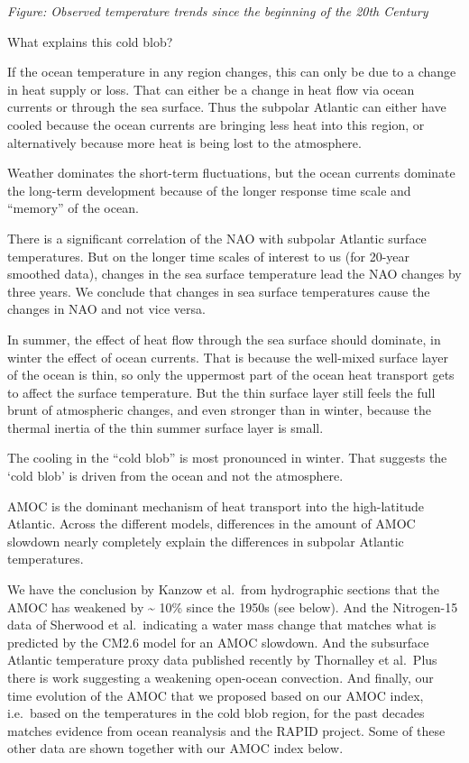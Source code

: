 \documentclass[
]{book}
\begin{document}
\emph{Figure: Observed temperature trends since the beginning of the 20th Century}

What explains this cold blob?

If the ocean temperature in any region changes, this can only be due to a change in heat supply or loss. That can either be a change in heat flow via ocean currents or through the sea surface. Thus the subpolar Atlantic can either have cooled because the ocean currents are bringing less heat into this region, or alternatively because more heat is being lost to the atmosphere.

Weather dominates the short-term fluctuations, but the ocean currents dominate the long-term development because of the longer response time scale and ``memory'' of the ocean.

There is a significant correlation of the NAO with subpolar Atlantic surface temperatures. But on the longer time scales of interest to us (for 20-year smoothed data), changes in the sea surface temperature lead the NAO changes by three years. We conclude that changes in sea surface temperatures cause the changes in NAO and not vice versa.

In summer, the effect of heat flow through the sea surface should dominate, in winter the effect of ocean currents.
That is because the well-mixed surface layer of the ocean is thin, so only the uppermost part of the ocean heat transport gets to affect the surface temperature. But the thin surface layer still feels the full brunt of atmospheric changes, and even stronger than in winter, because the thermal inertia of the thin summer surface layer is small.

The cooling in the ``cold blob'' is most pronounced in winter.
That suggests the `cold blob' is driven from the ocean and not the atmosphere.

AMOC is the dominant mechanism of heat transport into the high-latitude Atlantic.
Across the different models, differences in the amount of AMOC slowdown nearly completely explain the differences in subpolar Atlantic temperatures.

We have the conclusion by Kanzow et al.~from hydrographic sections that the AMOC has weakened by \textasciitilde{} 10\% since the 1950s (see below). And the Nitrogen-15 data of Sherwood et al.~indicating a water mass change that matches what is predicted by the CM2.6 model for an AMOC slowdown. And the subsurface Atlantic temperature proxy data published recently by Thornalley et al.~Plus there is work suggesting a weakening open-ocean convection. And finally, our time evolution of the AMOC that we proposed based on our AMOC index, i.e.~based on the temperatures in the cold blob region, for the past decades matches evidence from ocean reanalysis and the RAPID project. Some of these other data are shown together with our AMOC index below.
\end{document}

